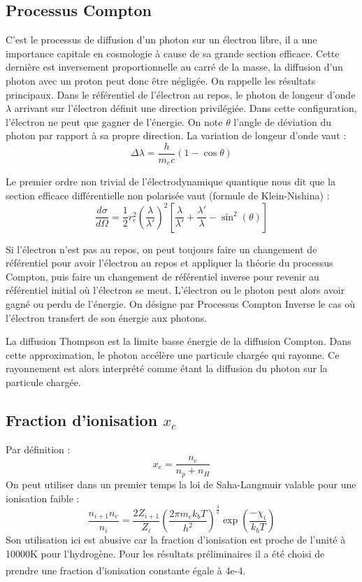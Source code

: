 \documentclass[10pt, a4paper]{report}
\numberwithin{equation}{subsection}
\begin{document}
\subsection{Processus Compton}
C'est le processus de diffusion d'un photon sur un électron libre, il a une importance capitale en cosmologie à cause de sa grande section efficace. Cette dernière est inversement proportionnelle au carré de la masse, la diffusion d'un photon avec un proton peut donc être négligée. On rappelle les résultats principaux. Dans le référentiel de l'électron au repos, le photon de longeur d'onde $\lambda$ arrivant sur l'électron définit une direction privilégiée. Dans cette configuration, l'électron ne peut que gagner de l'énergie. On note $\theta$ l'angle de déviation du photon par rapport à sa propre direction.
La variation de longeur d'onde vaut :
\begin{equation} \label{eq:VLO}
\boxed{\Delta\lambda=\frac{h}{m_e c}(1 - \cos \theta)}
\end{equation}

 Le premier ordre non trivial de l'électrodynamique quantique nous dit que la section efficace différentielle non polarisée vaut (formule de Klein-Nishina) :
\begin{equation} \label{eq:QED}
\boxed{\frac{d\sigma}{d\Omega} = \frac{1}{2} r_e^2 \left(\frac{\lambda}{\lambda'}\right)^{2} \left[\frac{\lambda}{\lambda'} + \frac{\lambda'}{\lambda} - \sin^2(\theta)\right]}
\end{equation}


Si l'électron n'est pas au repos, on peut toujours faire un changement de référentiel pour avoir l'électron au repos et appliquer la théorie du processus Compton, puis faire un changement de référentiel inverse pour revenir au référentiel initial où l'électron se meut. L'électron ou le photon peut alors avoir gagné ou perdu de l'énergie. On désigne par Processus Compton Inverse le cas où l'électron transfert de son énergie aux photons.

La diffusion Thompson est la limite basse énergie de la diffusion Compton. Dans cette approximation, le photon accélère une particule chargée qui rayonne. Ce rayonnement est alors interprété comme étant la diffusion du photon sur la particule chargée. 
 
\subsection{Fraction d'ionisation $x_e$}
Par définition :
\begin{equation} \label{eq:XE}
\boxed{x_e= \frac{n_e}{n_p+n_H}}
\end{equation}
On peut utiliser dans un premier temps la loi de Saha-Langmuir valable pour une ionisation faible :
\begin{equation} \label{eq:XESL}
\boxed{\frac{n_{i+1} n_e }{n_i} = \frac{2 Z_{i+1}}{Z_i} \left( \frac{2\pi m_ek_bT}{h^2}\right)^{\frac{3}{2}} \exp(\frac{-\chi_i}{k_bT})}
\end{equation}
Son utilisation ici est abusive car la fraction d'ionisation est proche de l'unité à 10000K pour l'hydrogène. Pour les résultats préliminaires il a été choisi de prendre une fraction d'ionisation constante égale à 4e-4\textsuperscript{\cite{Flower}}.
\end{document}
